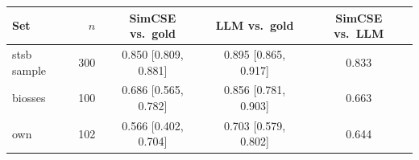 \begin{tabular}{lrccc}
\toprule
Set & $n$ & SimCSE vs.\ gold & LLM vs.\ gold & SimCSE vs.\ LLM \\
\midrule
stsb sample & 300 & 0.850 [0.809, 0.881] & 0.895 [0.865, 0.917] & 0.833 \\
biosses & 100 & 0.686 [0.565, 0.782] & 0.856 [0.781, 0.903] & 0.663 \\
own & 102 & 0.566 [0.402, 0.704] & 0.703 [0.579, 0.802] & 0.644 \\
\bottomrule
\end{tabular}